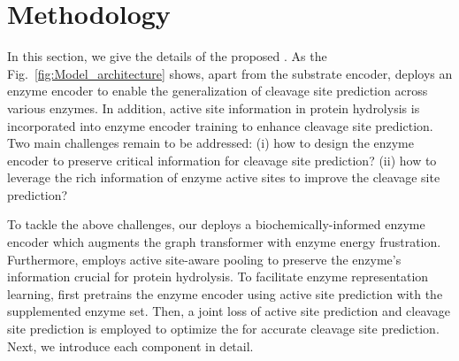 \section{Methodology}









In this section, we give the details of the proposed {\method}. As the Fig.~\ref{fig:Model_architecture} shows,  apart from the substrate encoder, {\method} deploys an enzyme encoder to enable the generalization of cleavage site prediction across various enzymes. In addition, active site information in protein hydrolysis is incorporated into enzyme encoder training to enhance cleavage site prediction. Two main challenges remain to be addressed: (i) how to design the enzyme encoder to preserve critical information for cleavage site prediction? (ii) how to leverage the rich information of enzyme active sites to improve the cleavage site prediction? 

To tackle the above challenges, our {\method} deploys a biochemically-informed enzyme encoder which augments the graph transformer with enzyme energy frustration\cite{Dai_2024}. Furthermore, {\method} employs active site-aware pooling to preserve the enzyme’s information crucial for protein hydrolysis. 
To facilitate enzyme representation learning, {\method} first pretrains the enzyme encoder using active site prediction with the supplemented enzyme set. Then, a joint loss of active site prediction and cleavage site prediction is employed to optimize the {\method} for accurate cleavage site prediction. Next, we introduce each component in detail.


